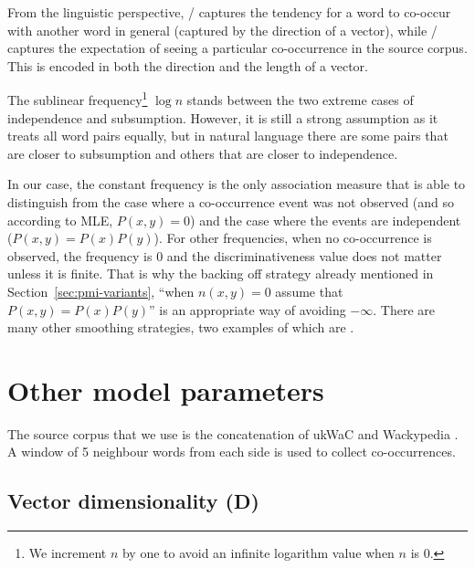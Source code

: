 From the linguistic perspective, \PMI/ captures the tendency for a word to co-occur with another word in general (captured by the direction of a vector), while \NPMI/ captures the expectation of seeing a particular co-occurrence in the source corpus. This is encoded in both the direction and the length of a vector.

The sublinear frequency\footnote{We increment $n$ by one to avoid an infinite logarithm value when $n$ is 0.} $\log n$ stands between the two extreme cases of independence and subsumption. However, it is still a strong assumption as it treats all word pairs equally, but in natural language there are some pairs that are closer to subsumption and others that are closer to independence.

In our case, the constant frequency is the only association measure that is able to distinguish from the case where a co-occurrence event was not observed (and so according to MLE, $P(x, y)= 0$) and the case where the events are independent ($P(x, y) = P(x)P(y)$). For other frequencies, when no co-occurrence is observed, the frequency is 0 and the discriminativeness value does not matter unless it is finite. That is why the backing off strategy already mentioned in Section~\ref{sec:pmi-variants}, ``when $n(x, y) = 0$ assume that $P(x, y) = P(x)P(y)$'' is an appropriate way of avoiding $-\infty$. There are many other smoothing strategies, two examples of which are .

\section{Other model parameters}
\label{sec:other-model-paramt}



The source corpus that we use is the concatenation of ukWaC and Wackypedia \cite{ukwac}.\footnotemark{} A window of 5 neighbour words from each side is used to collect co-occurrences.
%
%


\subsection{Vector dimensionality (D)}
\label{sec:vect-dimens}

